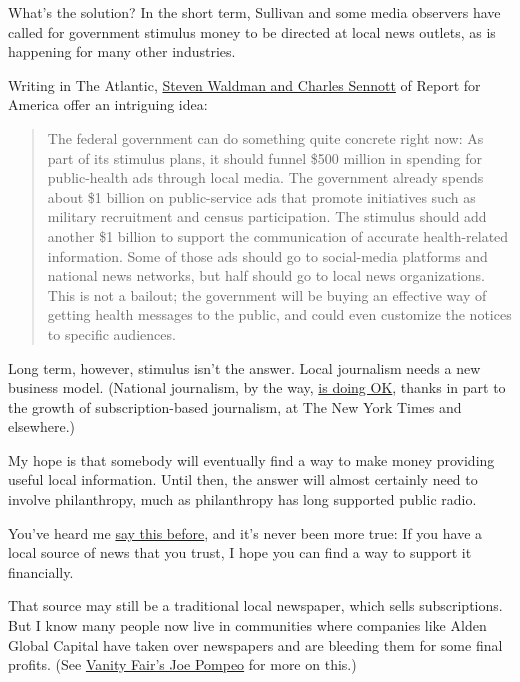 What's the solution? In the short term, Sullivan and some media
observers have called for government stimulus money to be directed at
local news outlets, as is happening for many other industries.

Writing in The Atlantic,
\href{https://www.theatlantic.com/ideas/archive/2020/03/coronavirus-killing-local-news/608695/}{Steven
Waldman and Charles Sennott} of Report for America offer an intriguing
idea:

\begin{quote}
The federal government can do something quite concrete right now: As
part of its stimulus plans, it should funnel \$500 million in spending
for public-health ads through local media. The government already spends
about \$1 billion on public-service ads that promote initiatives such as
military recruitment and census participation. The stimulus should add
another \$1 billion to support the communication of accurate
health-related information. Some of those ads should go to social-media
platforms and national news networks, but half should go to local news
organizations. This is not a bailout; the government will be buying an
effective way of getting health messages to the public, and could even
customize the notices to specific audiences.
\end{quote}

Long term, however, stimulus isn't the answer. Local journalism needs a
new business model. (National journalism, by the way,
\href{https://www.niemanlab.org/2020/02/the-wall-street-journal-joins-the-new-york-times-in-the-2-million-digital-subscriber-club/}{is
doing OK}, thanks in part to the growth of subscription-based
journalism, at The New York Times and elsewhere.)

My hope is that somebody will eventually find a way to make money
providing useful local information. Until then, the answer will almost
certainly need to involve philanthropy, much as philanthropy has long
supported public radio.

You've heard me
\href{https://www.nytimes.com/2018/11/21/opinion/local-journalism-news-media.html}{say
this before}, and it's never been more true: If you have a local source
of news that you trust, I hope you can find a way to support it
financially.

That source may still be a traditional local newspaper, which sells
subscriptions. But I know many people now live in communities where
companies like Alden Global Capital have taken over newspapers and are
bleeding them for some final profits. (See
\href{https://www.vanityfair.com/news/2020/02/hedge-fund-vampire-alden-global-capital-that-bleeds-newspapers-dry-has-chicago-tribune-by-the-throat}{Vanity
Fair's Joe Pompeo} for more on this.)

